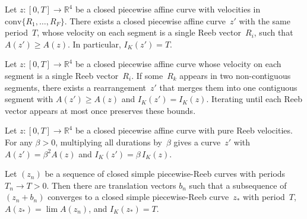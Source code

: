 \begin{lemma}\label{lem:splitting}
Let $z \colon [0,T] \to \mathbb{R}^4$ be a closed
piecewise affine curve with velocities in
$\mathrm{conv}\{R_1, \ldots, R_F\}$.
There exists a closed piecewise affine curve~$z'$
with the same period~$T$, whose velocity on each segment is a single
Reeb vector~$R_i$, such that
$A(z') \geq A(z)$.
In particular, $I_K(z') = T$.
\end{lemma}

\begin{lemma}\label{lem:merging}
Let $z \colon [0,T] \to \mathbb{R}^4$ be a closed piecewise affine
curve whose velocity on each segment is a single Reeb vector~$R_i$.
If some~$R_k$ appears in two non-contiguous segments, there
exists a rearrangement~$z'$ that merges them into one contiguous
segment with $A(z') \geq A(z)$ and $I_K(z') = I_K(z)$.
Iterating until each Reeb vector appears at most once preserves
these bounds.
\end{lemma}

\begin{lemma}[Rescaling]\label{lem:rescaling}
Let $z \colon [0,T] \to \mathbb{R}^4$ be a closed piecewise affine
curve with pure Reeb velocities.
For any $\beta > 0$, multiplying all durations by~$\beta$
gives a curve~$z'$ with
$A(z') = \beta^2 A(z)$ and $I_K(z') = \beta\, I_K(z)$.
\end{lemma}

\begin{lemma}\label{lem:compactness}
Let $(z_n)$ be a sequence of closed simple
piecewise-Reeb curves with periods $T_n \to T > 0$.
Then there are translation vectors $b_n$ such that a subsequence of
$(z_n + b_n)$ converges to a closed simple piecewise-Reeb curve~$z_*$
with period~$T$, $A(z_*) = \lim A(z_n)$, and $I_K(z_*) = T$.
\end{lemma}


